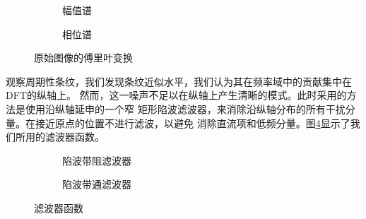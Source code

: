 \documentclass[UTF8]{article}
\begin{document}
\begin{figure}[htbp]
    \centering
    \begin{subfigure}{0.4\textwidth}
      \centering
      
      \caption{幅值谱}
      \label{fig:amp} %
    \end{subfigure}
    \begin{subfigure}{0.4\textwidth}
      \centering
      
      \caption{相位谱}
      \label{fig:phase} %
    \end{subfigure}
    \caption{原始图像的傅里叶变换}
    \label{fig:fft} %
\end{figure}
观察周期性条纹，我们发现条纹近似水平，我们认为其在频率域中的贡献集中在DFT的纵轴上。
然而，这一噪声不足以在纵轴上产生清晰的模式。此时采用的方法是使用沿纵轴延申的一个窄
矩形陷波滤波器，来消除沿纵轴分布的所有干扰分量。在接近原点的位置不进行滤波，以避免
消除直流项和低频分量。图\ref{fig:filter}显示了我们所用的滤波器函数。
\begin{figure}[htbp]
    \centering
    \begin{subfigure}{0.4\textwidth}
      \centering
      
      \caption{陷波带阻滤波器}
      \label{fig:filter} %
    \end{subfigure}
    \begin{subfigure}{0.4\textwidth}
      \centering
      
      \caption{陷波带通滤波器}
      \label{fig:filter2}%
    \end{subfigure}
    \caption{滤波器函数}
    \label{fig:filters} %
\end{figure}
\end{document}

